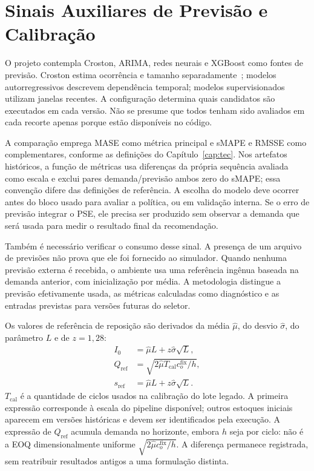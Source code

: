 \section{Sinais Auxiliares de Previsão e Calibração}
\label{sec:sinais_previsao}

O projeto contempla Croston, ARIMA, redes neurais e XGBoost como fontes de previsão. Croston estima ocorrência e tamanho separadamente~\citep{Croston1972ForecastingIntermittentDemand}; modelos autorregressivos descrevem dependência temporal; modelos supervisionados utilizam janelas recentes. A configuração determina quais candidatos são executados em cada versão. Não se presume que todos tenham sido avaliados em cada recorte apenas porque estão disponíveis no código.

A comparação emprega MASE como métrica principal e sMAPE e RMSSE como complementares, conforme as definições do Capítulo~\ref{cap:tec}. Nos artefatos históricos, a função de métricas usa diferenças da própria sequência avaliada como escala e exclui pares demanda/previsão ambos zero do sMAPE; essa convenção difere das definições de referência. A escolha do modelo deve ocorrer antes do bloco usado para avaliar a política, ou em validação interna. Se o erro de previsão integrar o PSE, ele precisa ser produzido sem observar a demanda que será usada para medir o resultado final da recomendação.

Também é necessário verificar o consumo desse sinal. A presença de um arquivo de previsões não prova que ele foi fornecido ao simulador. Quando nenhuma previsão externa é recebida, o ambiente usa uma referência ingênua baseada na demanda anterior, com inicialização por média. A metodologia distingue a previsão efetivamente usada, as métricas calculadas como diagnóstico e as entradas previstas para versões futuras do seletor.

Os valores de referência de reposição são derivados da média $\hat\mu$, do desvio $\hat\sigma$, do parâmetro $L$ e de $z=1{,}28$:
\begin{align}
I_0&=\hat\mu L+z\hat\sigma\sqrt L,\label{eq:I0_metod}\\
Q_{\mathrm{ref}}&=\sqrt{2\hat\mu T_{\mathrm{cal}}c_o^{\mathrm{fix}}/h},\label{eq:qref_metod}\\
s_{\mathrm{ref}}&=\hat\mu L+z\hat\sigma\sqrt L.\label{eq:sref_metod}
\end{align}
$T_{\mathrm{cal}}$ é a quantidade de ciclos usados na calibração do lote legado. A primeira expressão corresponde à escala do pipeline disponível; outros estoques iniciais aparecem em versões históricas e devem ser identificados pela execução. A expressão de $Q_{\mathrm{ref}}$ acumula demanda no horizonte, embora $h$ seja por ciclo: não é a EOQ dimensionalmente uniforme $\sqrt{2\hat\mu c_o^{\mathrm{fix}}/h}$. A diferença permanece registrada, sem reatribuir resultados antigos a uma formulação distinta.

